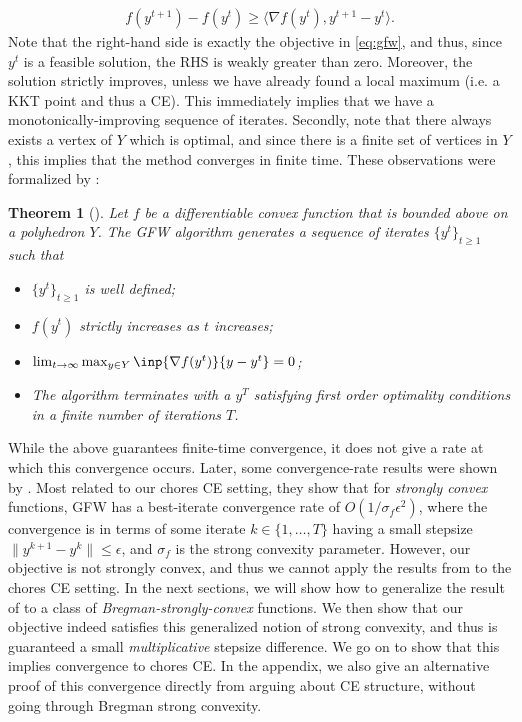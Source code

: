 \documentclass[format=acmsmall,authorversion]{acmart}
\newtheorem{theorem}{Theorem}
\newcommand{\ntl}[1]{{\textcolor{teal}{Tianlong: #1}}}
\begin{document}
\begin{align}
    f(y^{t+1}) - f(y^t) \geq \langle \nabla f(y^t), y^{t+1} - y^t \rangle.
    \label{eq:subgradient inequality}
\end{align}
Note that the right-hand side is exactly the objective in \cref{eq:gfw}, and thus, since $y^t$ is a feasible solution, the RHS is weakly greater than zero. Moreover, the solution strictly improves, unless we have already found a local maximum (i.e. a KKT point and thus a CE).
This immediately implies that we have a monotonically-improving sequence of iterates. Secondly, note that there always exists a vertex of $Y$ which is optimal, and since there is a finite set of vertices in $Y$, this implies that the method converges in finite time.
These observations were formalized by \citet{mangasarian1996machine}:



\begin{theorem}[\citet{mangasarian1996machine}]
    Let $f$ be a differentiable convex function that is bounded above on a polyhedron $Y$. 
    The GFW algorithm generates a sequence of iterates $\{ y^t \}_{t \geq 1}$ such that 
    \begin{itemize} 
        \item[(i)] $\{ y^t \}_{t \geq 1}$ is well defined; 
        \item[(ii)] $f(y^t)$ strictly increases as $t$ increases; 
        \item[(iii)] $\lim_{t \rightarrow \infty} \max_{y \in Y} \inp{\nabla f(y^t)}{y - y^t} = 0$; 
        \item[(iv)] The algorithm terminates with a $y^T$ satisfying first order optimality conditions in a finite number of iterations $T$.
    \end{itemize} 
\end{theorem}

While the above guarantees finite-time convergence, it does not give a rate at which this convergence occurs. 
Later, some convergence-rate results were shown by \citet{journee2010generalized}. 
Most related to our chores CE setting, they show that for \emph{strongly convex} functions, GFW has a best-iterate convergence rate of $O(1/\sigma_f \epsilon^2)$, where the convergence is in terms of some iterate $k \in \{1,\ldots,T\}$ having a small stepsize $\|y^{k+1}-y^k\| \leq \epsilon$, and $\sigma_f$ is the strong convexity parameter.
However, our objective is not strongly convex, and thus we cannot apply the results from \citet{journee2010generalized} to the chores CE setting.
In the next sections, we will show how to generalize the result of  \citet{journee2010generalized} to a class of \emph{Bregman-strongly-convex} functions. We then show that our objective indeed satisfies this generalized notion of strong convexity, and thus is guaranteed a small \emph{multiplicative} stepsize difference.
We go on to show that this implies convergence to chores CE.
In the appendix, we also give an alternative proof of this convergence directly from arguing about CE structure, without going through Bregman strong convexity.
\end{document}
